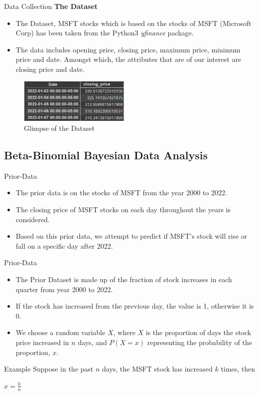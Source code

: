 \documentclass{beamer}
\begin{document}
\begin{frame}{Data Collection}
   \textbf{The Dataset}
     \begin{itemize}
    \item The Dataset, MSFT stocks which is based on the stocks of MSFT (Microsoft Corp)  has been taken from the Python3 \textit{yfinance} package.
    \item The data includes opening price, closing price, maximum price, minimum price and date. Amongst which, the attributes that are of our interest are closing price and date.
\end{itemize}
\begin{figure}[htp]
\includegraphics[width=0.475\textwidth]{Images/Glimpse.png}
\caption{Glimpse of the Dataset}
\end{figure}  
\end{frame}
\begin{frame}
\section{Beta-Binomial Bayesian Data Analysis}
\end{frame}
\begin{frame}{Prior-Data}
\begin{itemize}
    \item The prior data is on the stocks of MSFT from the year 2000 to 2022.
    \item The closing price of MSFT stocks on each day throughout the years is considered.
    \item Based on this prior data, we attempt to predict if MSFT's stock will rise or fall on a specific day after 2022.  
\end{itemize}
\end{frame}
\begin{frame}{Prior-Data}
\begin{itemize}
    \item The Prior Dataset is made up of the fraction of stock increases in each quarter from year 2000 to 2022.
    \item If the stock has increased from the previous day, the value is 1, otherwise it is 0.
    \item We choose a random variable $X$, where $X$ is the proportion of days the stock price increased in $n$ days, and $P(X = x)$ representing the probability of the proportion, $x$.  
\end{itemize}
\begin{block}{Example}
    Suppose in the past $n$ days, the MSFT stock has increased $k$ times, then
\begin{center}
    $x = \frac{k}{n}$
\end{center}
\end{block} 
\end{frame}
\end{document}
